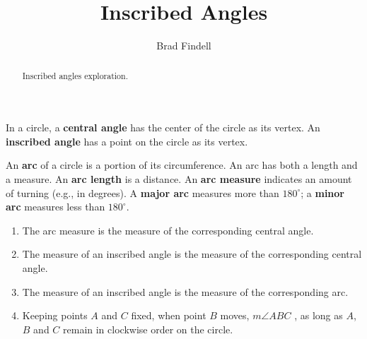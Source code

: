 \documentclass[handout,nooutcomes]{ximera}
\title{Inscribed Angles}
\author{Brad Findell}
\begin{document}
\begin{abstract}
Inscribed angles exploration.
\end{abstract}
\maketitle


\begin{definition}
In a circle, a \textbf{central angle} has the center of the circle as its vertex.  
An \textbf{inscribed angle} has a point on the circle as its vertex. 
\end{definition}

\begin{definition}
An \textbf{arc} of a circle is a portion of its circumference.  An arc has both a length and a measure.  An \textbf{arc length} is a distance.  An \textbf{arc measure} indicates an amount of turning (e.g., in degrees).  A \textbf{major arc} measures more than $180^\circ$; a \textbf{minor arc} measures less than $180^\circ$.    
\end{definition}

\begin{center}  
\end{center}

\begin{problem}

\begin{enumerate}

\item The arc measure is  the measure of the corresponding central angle. 
\item The measure of an inscribed angle is  the measure of the corresponding central angle. 
\item The measure of an inscribed angle is  the measure of the corresponding arc. 
\item Keeping points $A$ and $C$ fixed, when point $B$ moves, $m\angle ABC$ , as long as $A$, $B$ and $C$ remain in clockwise order on the circle.  

\end{enumerate}
\end{problem}


\end{document}
